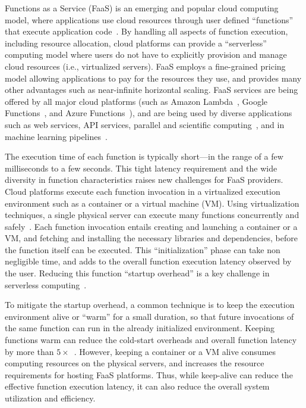 
Functions as a Service (FaaS) is an emerging and popular cloud computing model, where applications use cloud resources through user defined ``functions'' that execute application code~\cite{jonas2017occupy,jonas_cloud_2019,van_eyk_spec_2017}.
By handling all aspects of function execution, including resource allocation, cloud platforms can  provide a ``serverless'' computing model where users do not have to explicitly provision and manage cloud resources (i.e., virtualized servers).
FaaS employs a fine-grained pricing model allowing applications to pay for the resources they use, and provides many other advantages such as near-infinite horizontal scaling. 
FaaS services are being offered by all major cloud platforms (such as Amazon Lambda~\cite{aws-lambda}, Google Functions~\cite{google-functions}, and Azure Functions~\cite{azure-functions}), and are being used by diverse applications such as web services, API services,  parallel and scientific computing~\cite{funcx_hpdc_20,john_sweep_2019,fouladi_laptop_2019}, and in machine learning pipelines~\cite{carreira2018case, carreira_cirrus_2019}. 


The execution time of each function is typically short---in the range of a few milliseconds to a few seconds.
This tight latency requirement and the wide diversity in function characteristics raises new challenges for FaaS providers. 
Cloud platforms execute each function invocation in a virtualized execution environment such as a container or a virtual machine (VM). %
Using virtualization techniques, a single physical server can execute many functions concurrently and safely~\cite{wang2018peeking}. 
Each function invocation entails creating and launching a container or a VM, and fetching and installing the necessary libraries and dependencies, before the function itself can be executed.
This ``initialization'' phase can take non negligible time, and adds to the overall function execution latency observed by the user. 
Reducing this function ``startup overhead'' is a key challenge in serverless computing~\cite{oakes_sock_2018, hendrickson2016serverless, warm1, warm2}. 


To mitigate the startup overhead, a common technique is to keep the execution environment alive or ``warm'' for a small duration, so that future invocations of the same function can run in the already initialized environment. 
Keeping functions warm can reduce the cold-start overheads and overall function latency by more than  $5\times$~\cite{manner_cold_2018}.  
However, keeping a container or a VM alive consumes computing resources on the physical servers, and increases the resource requirements for hosting FaaS platforms. 
Thus, while keep-alive can reduce the effective function execution latency, it can also reduce the overall system utilization and efficiency.



